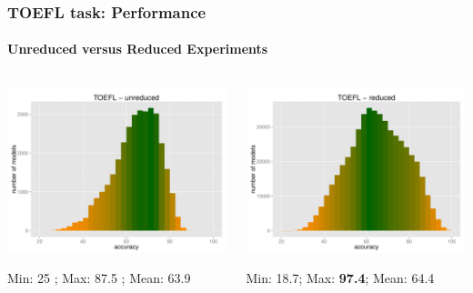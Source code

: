 \documentclass[t]{beamer} %
\begin{document}
\begin{frame}
  \frametitle{TOEFL task: Performance}
  \framesubtitle{Unreduced versus Reduced Experiments}
  \centering
  
  \begin{columns}

    \begin{column}{0.5\textwidth}
      \centering
      \hspace*{-18pt}   \includegraphics[scale=0.30]{img/lapesa_hist_toefl_unreduced}
      \begin{block}{}\footnotesize \centering
        Min:  25 ; Max: 87.5 ;  Mean: 63.9
      \end{block}
    \end{column}
    \begin{column}{0.5\textwidth}
      \hspace*{-18pt} 
      \includegraphics[scale=0.30]{img/lapesa_hist_toefl_reduced}
      \begin{block}{}\footnotesize \centering
        Min:  18.7; Max: \textbf{97.4};  Mean: 64.4
      \end{block}
    \end{column}
  \end{columns}
\end{frame}
\end{document}
